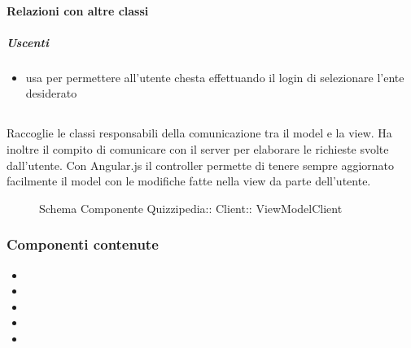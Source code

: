 \paragraph{Relazioni con altre classi}
\subparagraph{Uscenti}
\begin{itemize}
\item usa  per permettere all'utente chesta effettuando il login di selezionare l'ente desiderato
\end{itemize}
\subsection{}
Raccoglie le classi responsabili della comunicazione tra il model e la view. Ha inoltre il compito di comunicare con il server per elaborare le richieste svolte dall'utente.
Con Angular.js il controller permette di tenere sempre aggiornato facilmente il model con le modifiche fatte nella view da parte dell'utente.
\begin{figure}[H]
\centering
\noindent{}
\caption[Schema Componente ViewModelClient]{Schema Componente Quizzipedia:: Client:: ViewModelClient}
\end{figure}
\subsubsection{Componenti contenute}
\begin{itemize}
\item {}
\item {}
\item {}
\item {}
\item {}
\end{itemize}
